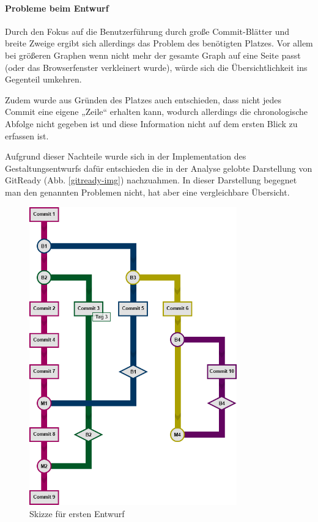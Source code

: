 \documentclass[color, ddc]{tudscrreprt}
\begin{document}
\paragraph{Probleme beim Entwurf}

Durch den Fokus auf die Benutzerführung durch große Commit-Blätter und breite Zweige ergibt sich allerdings das Problem des benötigten Platzes. Vor allem bei größeren Graphen wenn nicht mehr der gesamte Graph auf eine Seite passt (oder das Browserfenster verkleinert wurde), würde sich die Übersichtlichkeit ins Gegenteil umkehren.

Zudem wurde aus Gründen des Platzes auch entschieden, dass nicht jedes Commit eine eigene „Zeile“ erhalten kann, wodurch allerdings die chronologische Abfolge nicht gegeben ist und diese Information nicht auf dem ersten Blick zu erfassen ist.

Aufgrund dieser Nachteile wurde sich in der Implementation des Gestaltungsentwurfs dafür entschieden die in der Analyse gelobte Darstellung von GitReady (Abb. \ref{gitready-img}) nachzuahmen. In dieser Darstellung begegnet man den genannten Problemen nicht, hat aber eine vergleichbare Übersicht.


\begin{figure}[ht!]
\centering
\includegraphics[width=0.8\textwidth]{Skizzen/2015-01 VisualisierungsSkizze-rev.png}
\caption{Skizze für ersten Entwurf}
\label{entwurf-img}
\end{figure}
\end{document}
